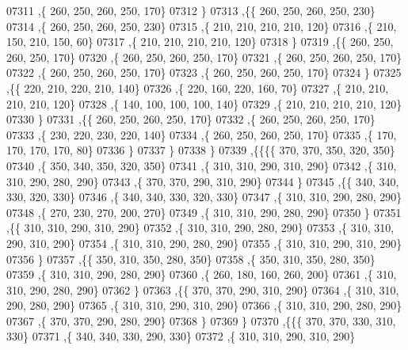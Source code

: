 \begin{DoxyCode}
07311     ,\{   260,   250,   260,   250,   170\}
07312     \}
07313    ,\{\{   260,   250,   260,   250,   230\}
07314     ,\{   260,   250,   260,   250,   230\}
07315     ,\{   210,   210,   210,   210,   120\}
07316     ,\{   210,   150,   210,   150,    60\}
07317     ,\{   210,   210,   210,   210,   120\}
07318     \}
07319    ,\{\{   260,   250,   260,   250,   170\}
07320     ,\{   260,   250,   260,   250,   170\}
07321     ,\{   260,   250,   260,   250,   170\}
07322     ,\{   260,   250,   260,   250,   170\}
07323     ,\{   260,   250,   260,   250,   170\}
07324     \}
07325    ,\{\{   220,   210,   220,   210,   140\}
07326     ,\{   220,   160,   220,   160,    70\}
07327     ,\{   210,   210,   210,   210,   120\}
07328     ,\{   140,   100,   100,   100,   140\}
07329     ,\{   210,   210,   210,   210,   120\}
07330     \}
07331    ,\{\{   260,   250,   260,   250,   170\}
07332     ,\{   260,   250,   260,   250,   170\}
07333     ,\{   230,   220,   230,   220,   140\}
07334     ,\{   260,   250,   260,   250,   170\}
07335     ,\{   170,   170,   170,   170,    80\}
07336     \}
07337    \}
07338   \}
07339  ,\{\{\{\{   370,   370,   350,   320,   350\}
07340     ,\{   350,   340,   350,   320,   350\}
07341     ,\{   310,   310,   290,   310,   290\}
07342     ,\{   310,   310,   290,   280,   290\}
07343     ,\{   370,   370,   290,   310,   290\}
07344     \}
07345    ,\{\{   340,   340,   330,   320,   330\}
07346     ,\{   340,   340,   330,   320,   330\}
07347     ,\{   310,   310,   290,   280,   290\}
07348     ,\{   270,   230,   270,   200,   270\}
07349     ,\{   310,   310,   290,   280,   290\}
07350     \}
07351    ,\{\{   310,   310,   290,   310,   290\}
07352     ,\{   310,   310,   290,   280,   290\}
07353     ,\{   310,   310,   290,   310,   290\}
07354     ,\{   310,   310,   290,   280,   290\}
07355     ,\{   310,   310,   290,   310,   290\}
07356     \}
07357    ,\{\{   350,   310,   350,   280,   350\}
07358     ,\{   350,   310,   350,   280,   350\}
07359     ,\{   310,   310,   290,   280,   290\}
07360     ,\{   260,   180,   160,   260,   200\}
07361     ,\{   310,   310,   290,   280,   290\}
07362     \}
07363    ,\{\{   370,   370,   290,   310,   290\}
07364     ,\{   310,   310,   290,   280,   290\}
07365     ,\{   310,   310,   290,   310,   290\}
07366     ,\{   310,   310,   290,   280,   290\}
07367     ,\{   370,   370,   290,   280,   290\}
07368     \}
07369    \}
07370   ,\{\{\{   370,   370,   330,   310,   330\}
07371     ,\{   340,   340,   330,   290,   330\}
07372     ,\{   310,   310,   290,   310,   290\}

\end{DoxyCode}
